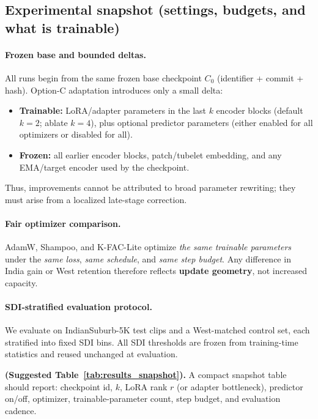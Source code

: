\subsection{Experimental snapshot (settings, budgets, and what is trainable)}
\label{sec:results_snapshot}

\paragraph{Frozen base and bounded deltas.}
All runs begin from the same frozen base checkpoint $C_0$ (identifier + commit + hash). Option-C adaptation introduces only a small delta:
\begin{itemize}[leftmargin=*,itemsep=2pt]
\item \textbf{Trainable:} LoRA/adapter parameters in the last $k$ encoder blocks (default $k=2$; ablate $k=4$), plus optional predictor parameters (either enabled for all optimizers or disabled for all).
\item \textbf{Frozen:} all earlier encoder blocks, patch/tubelet embedding, and any EMA/target encoder used by the checkpoint.
\end{itemize}
Thus, improvements cannot be attributed to broad parameter rewriting; they must arise from a localized late-stage correction.

\paragraph{Fair optimizer comparison.}
AdamW, Shampoo, and K-FAC-Lite optimize \emph{the same trainable parameters} under the \emph{same loss}, \emph{same schedule}, and \emph{same step budget}. Any difference in India gain or West retention therefore reflects \textbf{update geometry}, not increased capacity.

\paragraph{SDI-stratified evaluation protocol.}
We evaluate on IndianSuburb-5K test clips and a West-matched control set, each stratified into fixed SDI bins. All SDI thresholds are frozen from training-time statistics and reused unchanged at evaluation.

\vspace{4pt}
\noindent\textbf{(Suggested Table~\ref{tab:results_snapshot}).}
A compact snapshot table should report: checkpoint id, $k$, LoRA rank $r$ (or adapter bottleneck), predictor on/off, optimizer, trainable-parameter count, step budget, and evaluation cadence.

